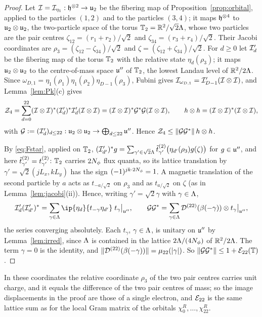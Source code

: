 \begin{proof}
Let $\mathcal{I}=\mathcal{I}_{\eta_1}:\mathfrak{h}^{\otimes2}\to\mathfrak{u}_2$ be the fibering map of Proposition~\ref{prop:orbital}, applied to the particles $(1,2)$ and to the
particles $(3,4)$; it maps $\mathfrak{h}^{\otimes4}$ to $\mathfrak{u}_2\otimes\mathfrak{u}_2$, the two-particle space of the torus $\mathbb{T}_2=\mathbb{R}^2/\sqrt2\Lambda$, whose two
particles are the pair centres $\zeta_{12}=(r_1+r_2)/\sqrt2$ and $\zeta_{34}=(r_3+r_4)/\sqrt2$. Their Jacobi coordinates are
$\rho_3=(\zeta_{12}-\zeta_{34})/\sqrt2$ and $\zeta=(\zeta_{12}+\zeta_{34})/\sqrt2$. For $d\ge0$ let $\mathcal{I}'_d$ be the fibering map of the torus
$\mathbb{T}_2$ with the relative state $\eta_d(\rho_3)$; it maps $\mathfrak{u}_2\otimes\mathfrak{u}_2$ to the centre-of-mass space $\mathfrak{u}''$ of $\mathbb{T}_2$, the lowest
Landau level of $\mathbb{R}^2/2\Lambda$. Since $\omega_{D,1}=\eta_1(\rho_1)\eta_1(\rho_2)\eta_{D-1}(\rho_3)$, Fubini gives
$\mathcal{I}_{\omega_{D,1}}=\mathcal{I}'_{D-1}(\mathcal{I}\otimes\mathcal{I})$, and Lemma~\ref{lem:Pk}(c) gives
\[
\mathcal Z_4=\sum_{d=0}^{22}(\mathcal{I}\otimes\mathcal{I})^*(\mathcal{I}'_d)^*\mathcal{I}'_d(\mathcal{I}\otimes\mathcal{I})=(\mathcal{I}\otimes\mathcal{I})^*\mathcal G^*\mathcal G(\mathcal{I}\otimes\mathcal{I}),\qquad h\otimes h=(\mathcal{I}\otimes\mathcal{I})^*(\mathcal{I}\otimes\mathcal{I}),
\]
with $\mathcal G:=(\mathcal{I}'_d)_{d\le22}:\mathfrak{u}_2\otimes\mathfrak{u}_2\to\bigoplus_{d\le22}\mathfrak{u}''$. Hence $\mathcal Z_4\le\lVert\mathcal G\mathcal G^*\rVert\,h\otimes h$.

By \eqref{eq:Fstar}, applied on $\mathbb{T}_2$,
$(\mathcal{I}'_{d'})^*g=\sum_{\gamma'\in\sqrt2\Lambda}\tilde t^{(2)}_{\gamma'}\bigl(\eta_{d'}(\rho_3)g(\zeta)\bigr)$ for $g\in\mathfrak{u}''$, and here
$\tilde t^{(2)}_{\gamma'}=t^{(2)}_{\gamma'}$: $\mathbb{T}_2$ carries $2N_{\phi}$ flux quanta, so its lattice translation by $\gamma'=\sqrt2(jL_x,kL_y)$
has the sign $(-1)^{jk\cdot2N_{\phi}}=1$. A magnetic translation of the second
particle by $a$ acts as $t_{-a/\sqrt2}$ on $\rho_3$ and as $t_{a/\sqrt2}$ on $\zeta$ (as in Lemma~\ref{lem:jacobi}(ii)). Hence, writing
$\gamma'=\sqrt2\gamma$ with $\gamma\in\Lambda$,
\[
\Fib'_d(\Fib'_{d'})^*=\sum_{\gamma\in\Lam}\ip{\eta_d}{t_{-\gamma}\eta_{d'}}\;t_\gamma\big|_{\U''},\qquad
\mathcal G\mathcal G^*=\sum_{\gamma\in\Lam}\Dis^{(22)}(\beta(-\gamma))\otimes t_\gamma\big|_{\U''},
\]
the series converging absolutely. Each $t_\gamma$, $\gamma\in\Lambda$, is unitary on $\mathfrak{u}''$ by
Lemma~\ref{lem:irred}, since $\Lambda$ is contained in the lattice $2\Lambda/(4N_{\phi})$ of $\mathbb{R}^2/2\Lambda$. The term $\gamma=0$ is the identity,
and $\lVert\mathcal{D}^{(22)}(\beta(-\gamma))\rVert=\mu_{22}(\lvert\gamma\rvert)$. So $\lVert\mathcal G\mathcal G^*\rVert\le1+\mathcal{E}_{22}(\mathbb{T})$.
\end{proof}

In these coordinates the relative coordinate $\rho_3$ of the two pair centres carries unit charge, and it equals the difference
of the two pair centres of mass; so the image displacements in the proof are those of a single electron, and $\mathcal{E}_{22}$ is the
same lattice sum as for the local Gram matrix of the orbitals $\chi_0^R,\dots,\chi_{22}^R$.

